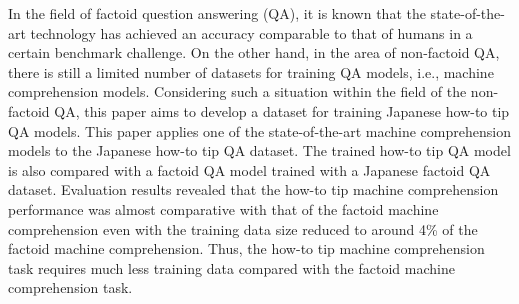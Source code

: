 In the field of factoid question answering (QA), it is known that the state-of-the-art technology has achieved an accuracy comparable to that of humans in a certain benchmark challenge.  On the other hand, in the area of non-factoid QA, there is still a limited number of datasets for training QA models, i.e., machine comprehension models.  Considering such a situation within the field of the non-factoid QA, this paper aims to develop a dataset for training Japanese how-to tip QA models.  This paper applies one of the state-of-the-art machine comprehension models to the Japanese how-to tip QA dataset. The trained how-to tip QA model is also compared with a factoid QA model trained with a Japanese factoid QA dataset. Evaluation results revealed that the how-to tip machine comprehension performance was almost comparative with that of the factoid machine comprehension even with the training data size reduced to around 4\% of the factoid machine comprehension.  Thus, the how-to tip machine comprehension task requires much less training data compared with the factoid machine comprehension task.
